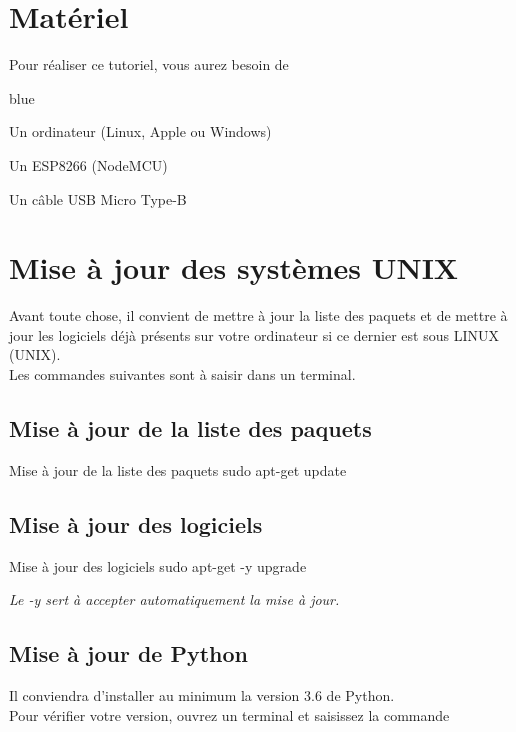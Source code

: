 \section{Matériel}

Pour réaliser ce tutoriel, vous aurez besoin de 

\begin{items}{blue}{\Triangle}
    \item Un ordinateur (Linux, Apple ou Windows)
    \item Un ESP8266 (NodeMCU)
    \item Un câble USB Micro Type-B
    
\end{items}

\section{Mise à jour des systèmes UNIX}

Avant toute chose, il convient de mettre à jour la liste des paquets et de mettre à jour les logiciels déjà présents sur votre ordinateur si ce dernier est sous LINUX (UNIX). \\
Les commandes suivantes sont à saisir dans un terminal.

\subsection{Mise à jour de la liste des paquets}

\begin{Bash}{Mise à jour de la liste des paquets}
sudo apt-get update
\end{Bash}


\subsection{Mise à jour des logiciels}
\begin{Bash}{Mise à jour des logiciels}
sudo apt-get -y upgrade
\end{Bash}

\textit{Le -y sert à accepter automatiquement la mise à jour.}

\subsection{Mise à jour de Python}

Il conviendra d'installer au minimum la version 3.6 de Python. \\
Pour vérifier votre version, ouvrez un terminal et saisissez la commande 

